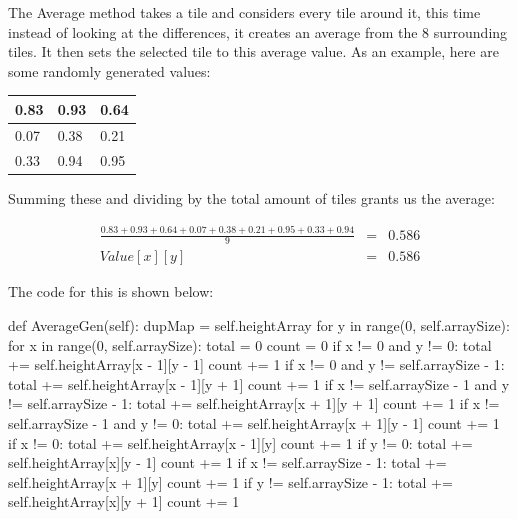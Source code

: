 \begin{flushleft}
            The Average method takes a tile and considers every tile around it, this time instead of looking at the
            differences, it creates an average from the 8 surrounding tiles. It then sets the selected tile to this
            average value. As an example, here are some randomly generated values:

            \begin{center}
                \begin{tabular}{| C{0.75cm} | C{0.75cm} | C{0.75cm} |}
                     & 0.93 & 0.64 \\ [0.75cm]
                     & 0.38 & 0.21 \\ [0.75cm]
                     & 0.94 & 0.95 \\ [0.75cm]
                    \hline
                \end{tabular}
                \vspace{0.25cm}

                Summing these and dividing by the total amount of tiles grants us the average:

                \begin{eqnarray*}
                    \frac{0.83 + 0.93 + 0.64 + 0.07 + 0.38 + 0.21 + 0.95 + 0.33 + 0.94}{9} &=& 0.586 \\
                    Value[x][y] &=& 0.586
                \end{eqnarray*}
            \end{center}
            \vspace{0.25cm}

            The code for this is shown below:
            \begin{pythoncode}
def AverageGen(self):
    dupMap = self.heightArray
    for y in range(0, self.arraySize):
        for x in range(0, self.arraySize):        
            total = 0
            count = 0
            if x != 0 and y != 0:
                total += self.heightArray[x - 1][y - 1]
                count += 1
            if x != 0 and y != self.arraySize - 1:
                total += self.heightArray[x - 1][y + 1]
                count += 1
            if x != self.arraySize - 1 and y != self.arraySize - 1:
                total += self.heightArray[x + 1][y + 1]
                count += 1
            if x != self.arraySize - 1 and y != 0:
                total += self.heightArray[x + 1][y - 1]
                count += 1
            if x != 0:
                total += self.heightArray[x - 1][y]
                count += 1
            if y != 0:
                total += self.heightArray[x][y - 1]
                count += 1
            if x != self.arraySize - 1:
                total += self.heightArray[x + 1][y]
                count += 1
            if y != self.arraySize - 1:
                total += self.heightArray[x][y + 1]
                count += 1


\end{pythoncode}
\end{flushleft}
